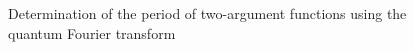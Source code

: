 \begin{figure}
\centering



\caption{Determination of the period of two-argument functions using the quantum
  Fourier transform}
\label{figQuantCompQuantPeriodFinding2}
\end{figure}